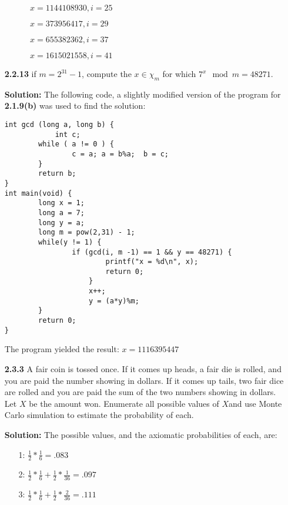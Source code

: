 \documentclass[11pt]{article} %
\newcommand{\tab}{\;\;\;\;\;}
\begin{document}
\begin{enumerate}
\begin{enumerate}
$\tab x = 1144108930, i = 25$

$\tab x = 373956417, i = 29$

$\tab x = 655382362, i = 37$

$\tab x = 1615021558, i = 41$

\end{enumerate}

\item[\bf{2.2.13}] if $m=2^{31}-1$, compute the $x\in\chi_m$ for which $7^x\mod m = 48271$.

{\bf Solution:} The following code, a slightly modified version of the program for {\bf 2.1.9(b)} was used to find the solution:

{\small{\begin{verbatim}
int gcd (long a, long b) {
        	int c;
        while ( a != 0 ) {
                c = a; a = b%a;  b = c;
        }
        return b;
}
int main(void) {
        long x = 1;
        long a = 7;
        long y = a;
        long m = pow(2,31) - 1;
        while(y != 1) {
                if (gcd(i, m -1) == 1 && y == 48271) {
                        printf("x = %d\n", x);
                        return 0;
                	}
                	x++;
                	y = (a*y)%m;
        }
        return 0;
}
\end{verbatim}}}

The program yielded the result: $x = 1116395447$

\item[\bf{2.3.3}] A fair coin is tossed once.  If it comes up heads, a fair die is rolled, and you are paid the number showing in dollars.  If it comes up tails, two fair dice are rolled and you are paid the sum of the two numbers showing in dollars.  Let $X$ be the amount won.  Enumerate all possible values of $X$and use Monte Carlo simulation to estimate the probability of each.

{\bf Solution:} The possible values, and the axiomatic probabilities of each, are:

\begin{enumerate}

\item[1:] $\frac{1}{2}*\frac{1}{6} = .083$

\item[2:] $\frac{1}{2}*\frac{1}{6} + \frac{1}{2}*\frac{1}{36} = .097$

\item[3:] $\frac{1}{2}*\frac{1}{6} + \frac{1}{2}*\frac{2}{36} = .111$


\end{enumerate}
\end{enumerate}
\end{document}
